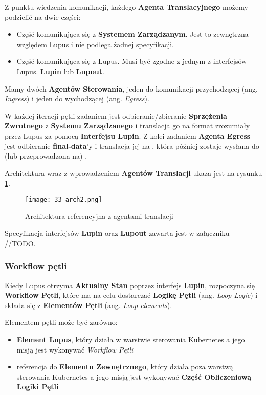 Z punktu wiedzenia komunikacji, każdego \textbf{Agenta Translacyjnego} możemy podzielić na dwie części:
\begin{itemize}
    \item Część komunikująca się z \textbf{Systemem Zarządzanym}. Jest to zewnętrzna względem Lupus i nie podlega żadnej specyfikacji.
    \item Część komunikująca się z Lupus. Musi być zgodne z jednym z interfejsów Lupus. \textbf{Lupin} lub \textbf{Lupout}.
\end{itemize}

Mamy dwóch \textbf{Agentów Sterowania}, jeden do komunikacji przychodzącej (ang. \textit{Ingress}) i jeden do wychodzącej (ang. \textit{Egress}). 

W każdej iteracji pętli zadaniem  jest odbieranie/zbieranie \textbf{Sprzężenia Zwrotnego} z \textbf{Systemu Zarządzanego} i translacja go na format zrozumiały przez Lupus za pomocą \textbf{Interfejsu Lupin}. Z kolei zadaniem \textbf{Agenta Egress} jest odbieranie \textbf{final-data}'y i translacja jej na , która później zostaje wysłana do (lub przeprowadzona na) .

Architektura wraz z wprowadzeniem \textbf{Agentów Translacji} ukaza jest na rysunku \ref{fig:33-arch2}.

\begin{figure}[!h]
    \centering \texttt{[image: 33-arch2.png]}
    \caption{Architektura referencyjna z agentami translacji}\label{fig:33-arch2}
\end{figure}

Specyfikacja interfejsów \textbf{Lupin} oraz \textbf{Lupout} zawarta jest w załączniku //TODO.

\subsubsection{Workflow pętli}

Kiedy Lupus otrzyma \textbf{Aktualny Stan} poprzez interfejs \textbf{Lupin}, rozpoczyna się \textbf{Workflow Pętli}, które ma na celu dostarczać \textbf{Logikę Pętli} (ang. \textit{Loop Logic}) i składa się z \textbf{Elementów Pętli} (ang. \textit{Loop elements}). 

Elementem pętli może być zarówno:
\begin{itemize}
    \item \textbf{Element Lupus}, który działa w warstwie sterowania Kubernetes a jego misją jest wykonywać \textit{Workflow Pętli}
    \item referencja do \textbf{Elementu Zewnętrznego}, który działa poza warstwą sterowania Kubernetes a jego misją jest wykonywać \textbf{Część Obliczeniową} \textbf{Logiki Pętli}
\end{itemize}

